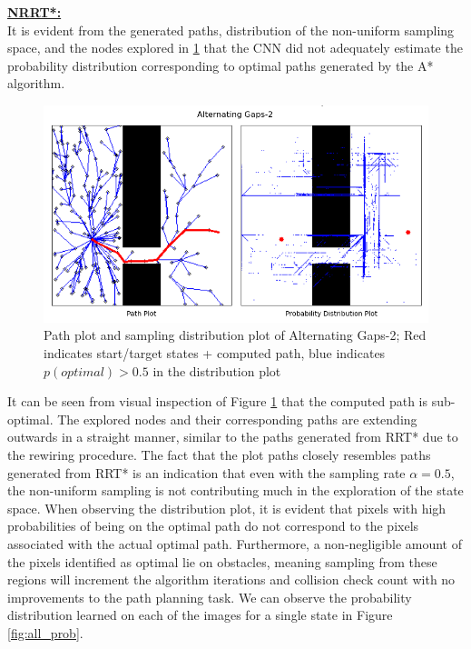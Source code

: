 \documentclass{article}
\begin{document}
\textbf{\underline{NRRT*:}}\\
It is evident from the generated paths, distribution of the non-uniform sampling space, and the nodes explored in \ref{fig:nrrt} that the CNN did not adequately estimate the probability distribution corresponding to optimal paths generated by the A* algorithm.

\begin{figure}
\centering
\includegraphics[scale=0.5]{nrrt_plot}
\caption{Path plot and sampling distribution plot of Alternating Gaps-2; Red indicates start/target states + computed path, blue indicates $p(optimal) > 0.5$ in the distribution plot}
\label{fig:nrrt}
\end{figure}

It can be seen from visual inspection of Figure \ref{fig:nrrt} that the computed path is sub-optimal. The explored nodes and their corresponding paths are extending outwards in a straight manner, similar to the paths generated from RRT* due to the rewiring procedure. The fact that the plot paths closely resembles paths generated from RRT* is an indication that even with the sampling rate $\alpha = 0.5$, the non-uniform sampling is not contributing much in the exploration of the state space. When observing the distribution plot, it is evident that pixels with high probabilities of being on the optimal path do not correspond to the pixels associated with the actual optimal path. Furthermore, a non-negligible amount of the pixels identified as optimal lie on obstacles, meaning sampling from these regions will increment the algorithm iterations and collision check count with no improvements to the path planning task. We can observe the probability distribution learned on each of the images for a single state in Figure \ref{fig:all_prob}.
\end{document}
